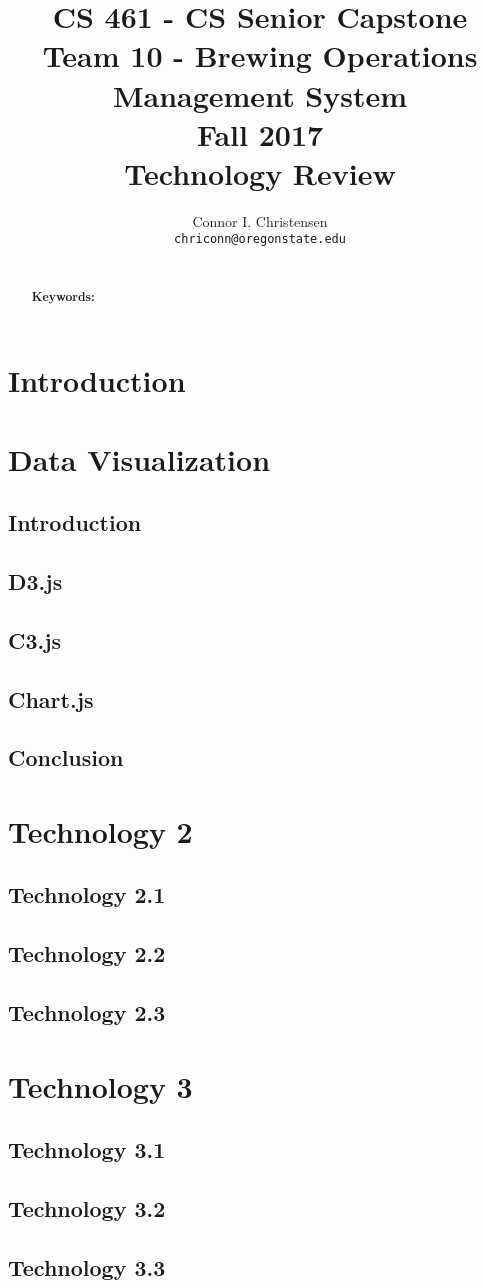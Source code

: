 \documentclass[draftclsnofoot,onecolumn,letterpaper,10pt,compsoc]{IEEEtran}
\title{CS 461 - CS Senior Capstone
  \\Team 10 - Brewing Operations Management System
	\\Fall 2017
	\\Technology Review
}
\author{
	Connor I. Christensen \\
	\texttt{chriconn@oregonstate.edu}
}
\begin{document}
\begin{titlingpage}
    \maketitle
    \begin{abstract}
      \\
			\textbf{Keywords:}
    \end{abstract}
		\pagebreak
		\tableofcontents
\end{titlingpage}

\section{Introduction}


\section{Data Visualization}
  \subsection{Introduction}
  \subsection{D3.js}
  \subsection{C3.js}
  \subsection{Chart.js}
  \subsection{Conclusion}


\section{Technology 2}
	\subsection{Technology 2.1}
	\subsection{Technology 2.2}
	\subsection{Technology 2.3}

\section{Technology 3}
	\subsection{Technology 3.1}
	\subsection{Technology 3.2}
	\subsection{Technology 3.3}
\end{document}
